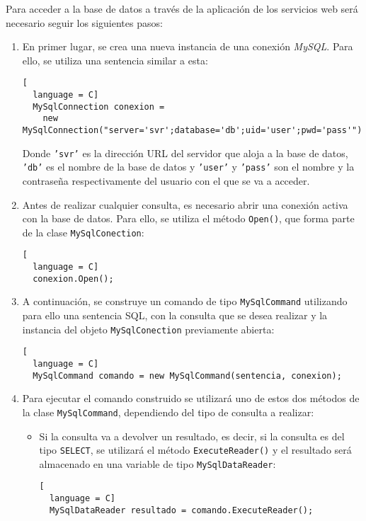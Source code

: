 Para acceder a la base de datos a través de la aplicación de los servicios web
será necesario seguir los siguientes pasos:
\begin{enumerate}
\item En primer lugar, se crea una nueva instancia de una conexión
\emph{MySQL}. Para ello, se utiliza una sentencia similar a esta:

\begin{lstlisting}[
  language = C]
  MySqlConnection conexion =
    new MySqlConnection("server='svr';database='db';uid='user';pwd='pass'");
\end{lstlisting}

Donde \texttt{'svr'} es la dirección \acs{URL} del servidor que aloja a la base
de datos, \texttt{'db'} es el nombre de la base de datos y \texttt{'user'} y
\texttt{'pass'} son el nombre y la contraseña respectivamente del usuario
con el que se va a acceder.

\item Antes de realizar cualquier consulta, es necesario
abrir una conexión activa con la base de datos. Para ello, se utiliza el
método \texttt{Open()}, que forma parte de la clase \texttt{MySqlConection}:

\begin{lstlisting}[
  language = C]
  conexion.Open();
\end{lstlisting}

\item A continuación, se construye un comando de tipo \texttt{MySqlCommand}
utilizando para ello una sentencia \acs{SQL}, con la consulta que se desea
realizar y la instancia del objeto \texttt{MySqlConection} previamente
abierta:

\begin{lstlisting}[
  language = C]
  MySqlCommand comando = new MySqlCommand(sentencia, conexion);
\end{lstlisting}

\item Para ejecutar el comando construido se utilizará uno de estos dos métodos
de la clase \texttt{MySqlCommand}, dependiendo del tipo de consulta a realizar:
\begin{itemize}
\item Si la consulta va a devolver un resultado, es decir, si la consulta
es del tipo \texttt{SELECT}, se utilizará el método \texttt{ExecuteReader()}
y el resultado será almacenado en una variable de tipo
\texttt{MySqlDataReader}:

\begin{lstlisting}[
  language = C]
  MySqlDataReader resultado = comando.ExecuteReader();
\end{lstlisting}


\end{itemize}
\end{enumerate}
